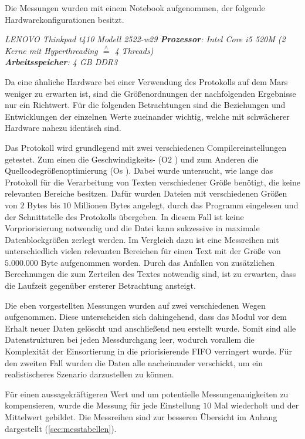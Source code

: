 \label{subCap:Messreihen}

Die Messungen wurden mit einem Notebook aufgenommen, der
folgende Hardwarekonfigurationen besitzt.

\textit{
	LENOVO Thinkpad t410 Modell 2522-w29 \newline
	\textbf{Prozessor}: Intel Core i5 520M (2 Kerne mit Hyperthreading $\stackrel{\wedge}=$ 4 Threads)\\
	\textbf{Arbeitsspeicher}: 4 GB DDR3	
	}

Da eine ähnliche Hardware bei einer Verwendung des Protokolls auf dem Mars
weniger zu erwarten ist, sind die Größenordnungen der nachfolgenden Ergebnisse
nur ein Richtwert. Für die folgenden Betrachtungen sind die Beziehungen und
Entwicklungen der einzelnen Werte zueinander wichtig, welche mit schwächerer
Hardware nahezu identisch sind.

Das Protokoll wird grundlegend mit zwei verschiedenen
Compilereinstellungen getestet. Zum einen die Geschwindigkeits- (\glqq O$2$
\grqq) und zum Anderen die Quellcodegrößenoptimierung (\glqq Os \grqq). Dabei
wurde untersucht, wie lange das Protokoll für die Verarbeitung von Texten
verschiedener Größe benötigt, die keine relevanten Bereiche besitzen. Dafür
wurden Dateien mit verschiedenen Größen von $2$ Bytes bis $10$ Millionen Bytes 
angelegt, durch das Programm eingelesen und der Schnittstelle des Protokolls
übergeben. In diesem Fall ist keine Vorpriorisierung notwendig und die Datei
kann sukzessive in maximale Datenblockgrößen zerlegt werden.
Im Vergleich dazu ist eine Messreihen mit unterschiedlich vielen relevanten
Bereichen für einen Text mit der Größe von $5.000.000$ Byte aufgenommen
worden.
Durch das Anfallen von zusätzlichen Berechnungen die zum Zerteilen 
des Textes notwendig sind, ist zu erwarten, dass die Laufzeit gegenüber
ersterer Betrachtung ansteigt.

Die eben vorgestellten Messungen wurden auf zwei verschiedenen Wegen
aufgenommen. Diese unterscheiden sich dahingehend, dass das Modul vor dem Erhalt
neuer Daten gelöscht und anschließend neu erstellt wurde. Somit sind alle
Datenstrukturen bei jeden Messdurchgang leer, wodurch vorallem die Komplexität
der Einsortierung in die priorisierende \gls{FIFO} verringert wurde. Für den
zweiten Fall wurden die Daten alle nacheinander verschickt, um ein realistischeres
Szenario darzustellen zu können.

Für einen aussagekräftigeren Wert und um potentielle Messungenauigkeiten zu
kompensieren, wurde die Messung für jede Einstellung $10$ Mal wiederholt und der
Mittelwert gebildet. Die Messreihen sind zur besseren Übersicht im
Anhang dargestellt (\ref{sec:messtabellen}).